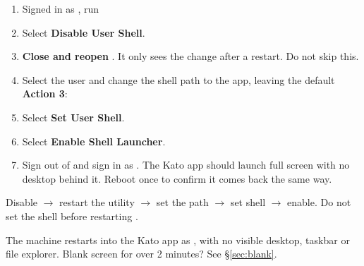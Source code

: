 \documentclass[a4paper,10pt]{article}
\begin{document}
\begin{enumerate}
  \item Signed in as , run\\

  \item Select \textbf{Disable User Shell}.

  \item \textbf{Close and reopen} . It only sees the
        change after a restart. Do not skip this.

  \item Select the  user and change the shell path to
        the app, leaving the default \textbf{Action 3}:\\

  \item Select \textbf{Set User Shell}.

  \item Select \textbf{Enable Shell Launcher}.

  \item Sign out of  and sign in as .
        The Kato app should launch full screen with no desktop behind it.
        Reboot once to confirm it comes back the same way.
\end{enumerate}

\begin{wkwarn}
Disable $\rightarrow$ restart the utility $\rightarrow$ set the path
$\rightarrow$ set shell $\rightarrow$ enable. Do not set the shell before
restarting .
\end{wkwarn}

\begin{wkinfo}
The machine restarts into the Kato app as , with
no visible desktop, taskbar or file explorer. Blank screen for over
2 minutes? See \S\ref{sec:blank}.
\end{wkinfo}


\clearpage
{}\label{sec:quickref}
\end{document}
